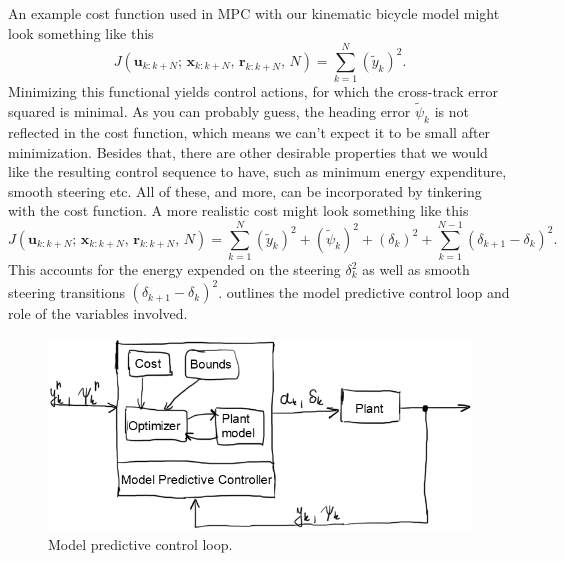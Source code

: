 \documentclass[a4paper]{article}
\begin{document}
An example cost function used in MPC with our kinematic bicycle model might look something like this
\begin{equation}\label{eq:mpc_cost_simple}
	J(\bm{u}_{k:k+N};\, \bm{x}_{k:k+N},\, \bm{r}_{k:k+N},\, N) = \sum_{k=1}^{N} (\tilde{y}_k)^2.
\end{equation}
Minimizing this functional yields control actions, for which the cross-track error squared is minimal.
As you can probably guess, the heading error \( \tilde{\psi}_k \) is not reflected in the cost function, which means we can't expect it to be small after minimization.
Besides that, there are other desirable properties that we would like the resulting control sequence to have, such as minimum energy expenditure, smooth steering etc.
All of these, and more, can be incorporated by tinkering with the cost function.
A more realistic cost might look something like this
\begin{equation}\label{eq:mpc_cost_better}
	J(\bm{u}_{k:k+N};\, \bm{x}_{k:k+N},\, \bm{r}_{k:k+N},\, N) = \sum_{k=1}^{N} (\tilde{y}_k)^2 + (\tilde{\psi}_k)^2 + (\delta_k)^2+ \sum_{k=1}^{N-1} (\delta_{k+1} - \delta_k)^2.
\end{equation}
This accounts for the energy expended on the steering \( \delta_k^2 \) as well as smooth steering transitions \( (\delta_{k+1} - \delta_k)^2 \).
 outlines the model predictive control loop and role of the variables involved.
\begin{figure}[h]
	\centering
	\includegraphics[width=0.8\columnwidth]{./img/mpc_control_loop.png}
	\caption{Model predictive control loop.}
	\label{fig:mpc_control_loop}
\end{figure}









\end{document}
